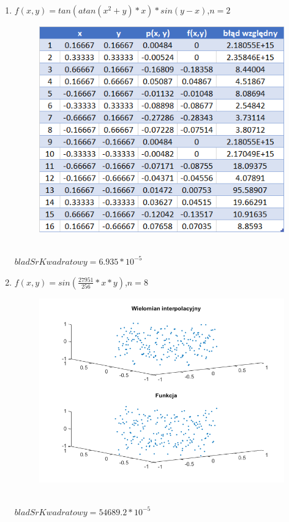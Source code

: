 \documentclass[12pt, leqno]{article}
\begin{document}
\begin{enumerate}
            \newpage
            \large
            \item{$f(x, y) = tan(atan(x^2 + y)*x)*sin(y-x)$,\quad $n = 2$}
            \begin{figure}[!h]
                \includegraphics[width=\linewidth]{func3.png}
            \end{figure}\\
            $bladSrKwadratowy = 6.935 * 10^{-5}$

            \newpage
            \large
            \item{$f(x, y) = sin(\frac{27951}{256}*x*y)$,\quad $n = 8$}
            \begin{figure}[!h]
                \includegraphics[width=\linewidth]{func4.png}
            \end{figure}\\
            $bladSrKwadratowy = 54689.2 * 10^{-5}$
        \end{enumerate}
\end{document}
